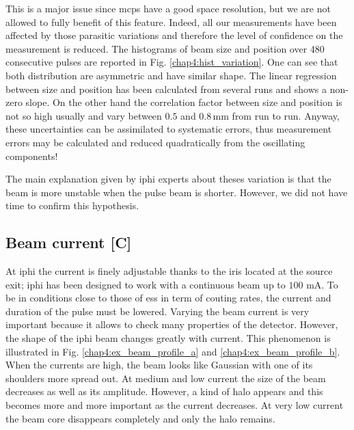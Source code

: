 \begin{refsection}
  

  This is a major issue since \acrshort{mcp}s have a good space resolution, but we are not allowed to fully benefit of this feature. Indeed, all our measurements have been affected by those parasitic variations and therefore the level of confidence on the measurement is reduced. The histograms of beam size and position over 480 consecutive pulses are reported in Fig. \ref{chap4:hist_variation}. One can see that both distribution are asymmetric and have similar shape. The linear regression between size and position has been calculated from several runs and shows a non-zero slope. On the other hand the correlation factor between size and position is not so high usually and vary between $0.5$ and $0.8\,\mathrm{mm}$ from run to run.
  Anyway, these uncertainties can be assimilated to systematic errors, thus measurement errors may be calculated and reduced quadratically from the oscillating components!

  

  The main explanation given by \acrshort{iphi} experts about theses variation is that the beam is more unstable when the pulse beam is shorter. However, we did not have time to confirm this hypothesis.

  \subsection{Beam current [C]}
  \label{chap4:sec:current}
  At \acrshort{iphi} the current is finely adjustable thanks to the iris located at the source exit; \acrshort{iphi} has been designed to work with a continuous beam up to $100$ $\mathrm{mA}$. To be in conditions close to those of \acrshort{ess} in term of couting rates, the current and duration of the pulse must be lowered. Varying the beam current is very important because it allows to check many properties of the detector. However, the shape of the \acrshort{iphi} beam changes greatly with current. This phenomenon is illustrated in Fig. \ref{chap4:ex_beam_profile_a} and \ref{chap4:ex_beam_profile_b}. When the currents are high, the beam looks like Gaussian with one of its shoulders more spread out. At medium and low current the size of the beam decreases as well as its amplitude. However, a kind of halo appears and this becomes more and more important as the current decreases. At very low current the beam core disappears completely and only the halo remains.


\end{refsection}
